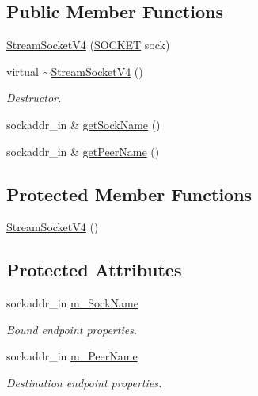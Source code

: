 \subsection*{Public Member Functions}
\begin{DoxyCompactItemize}
\item 
\hyperlink{classStreamSocketV4_a00d0a62cc92c6c9a3a29acba866e6483}{Stream\+Socket\+V4} (\hyperlink{sockclasslib_8h_a8dc8083897335125630f1af5dafd5831}{S\+O\+C\+K\+ET} sock)
\item 
virtual \hyperlink{classStreamSocketV4_a6a4b3d769b87c755698b8500942cbdf6}{$\sim$\+Stream\+Socket\+V4} ()
\begin{DoxyCompactList}\small\item\em Destructor. \end{DoxyCompactList}\item 
sockaddr\+\_\+in \& \hyperlink{classStreamSocketV4_ab5edf2c0cbc8b10784ca067cc64bc454}{get\+Sock\+Name} ()
\item 
sockaddr\+\_\+in \& \hyperlink{classStreamSocketV4_ad8ac7763ea0b17c79a9394e22276c2c4}{get\+Peer\+Name} ()
\end{DoxyCompactItemize}
\subsection*{Protected Member Functions}
\begin{DoxyCompactItemize}
\item 
\hyperlink{classStreamSocketV4_ad5ca1c6cb600fa2a247ceae1cd4e7d28}{Stream\+Socket\+V4} ()
\end{DoxyCompactItemize}
\subsection*{Protected Attributes}
\begin{DoxyCompactItemize}
\item 
sockaddr\+\_\+in \hyperlink{classStreamSocketV4_aa90b742744a04670c7533fa219468dc0}{m\+\_\+\+Sock\+Name}
\begin{DoxyCompactList}\small\item\em Bound endpoint properties. \end{DoxyCompactList}\item 
sockaddr\+\_\+in \hyperlink{classStreamSocketV4_a6455bf82f408a10f7e1c7cf0cf1dd535}{m\+\_\+\+Peer\+Name}
\begin{DoxyCompactList}\small\item\em Destination endpoint properties. \end{DoxyCompactList}\end{DoxyCompactItemize}
